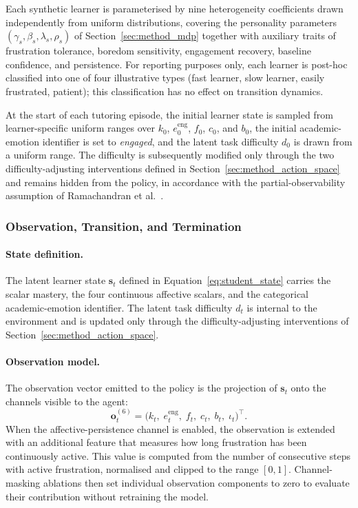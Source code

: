 Each synthetic learner is parameterised by nine heterogeneity coefficients drawn independently from uniform distributions, covering the personality parameters $(\gamma_s, \beta_s, \lambda_s, \rho_s)$ of Section~\ref{sec:method_mdp} together with auxiliary traits of frustration tolerance, boredom sensitivity, engagement recovery, baseline confidence, and persistence. For reporting purposes only, each learner is post-hoc classified into one of four illustrative types (fast learner, slow learner, easily frustrated, patient); this classification has no effect on transition dynamics.

At the start of each tutoring episode, the initial learner state is sampled from learner-specific uniform ranges over $k_0$, $e_0^\mathrm{eng}$, $f_0$, $c_0$, and $b_0$, the initial academic-emotion identifier is set to \emph{engaged}, and the latent task difficulty $d_0$ is drawn from a uniform range. The difficulty is subsequently modified only through the two difficulty-adjusting interventions defined in Section~\ref{sec:method_action_space} and remains hidden from the policy, in accordance with the partial-observability assumption of Ramachandran et al.~\cite{ramachandran_pomdp_2018}.

\subsubsection{Observation, Transition, and Termination}\label{sec:method_gymnasium}

\paragraph{State definition.} The latent learner state $\mathbf{s}_t$ defined in Equation~\eqref{eq:student_state} carries the scalar mastery, the four continuous affective scalars, and the categorical academic-emotion identifier. The latent task difficulty $d_t$ is internal to the environment and is updated only through the difficulty-adjusting interventions of Section~\ref{sec:method_action_space}.

\paragraph{Observation model.} The observation vector emitted to the policy is the projection of $\mathbf{s}_t$ onto the channels visible to the agent:
\begin{equation}
    \mathbf{o}_t^{(6)} = \bigl(k_t,\; e^\mathrm{eng}_t,\; f_t,\; c_t,\; b_t,\; \iota_t\bigr)^\top.
    \label{eq:obs_v6}
\end{equation}\label{sec:method_observation}
When the affective-persistence channel is enabled, the observation is extended with an additional feature that measures how long frustration has been continuously active. This value is computed from the number of consecutive steps with active frustration, normalised and clipped to the range $[0,1]$. Channel-masking ablations then set individual observation components to zero to evaluate their contribution without retraining the model.


